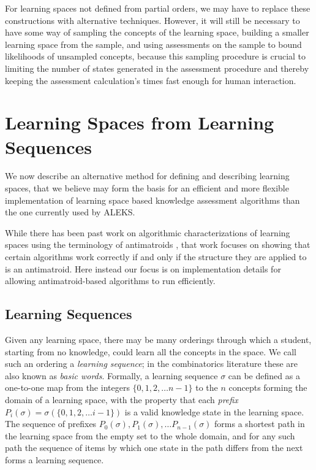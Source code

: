 \documentclass[11pt]{llncs}
\begin{document}
{For learning spaces not defined from partial orders, we may have to replace these constructions with alternative techniques. However, it will still be necessary to have some way of sampling the concepts of the learning space, building a smaller learning space from the sample, and using assessments on the sample to bound likelihoods of unsampled concepts, because this sampling procedure is crucial to limiting the number of states generated in the assessment procedure and thereby keeping the assessment calculation's times fast enough for human interaction.

\section{Learning Spaces from Learning Sequences}

We now describe an alternative method for defining and describing learning spaces, that we believe may form the basis for an efficient and more flexible implementation of learning space based knowledge assessment algorithms than the one currently used by ALEKS.

While there has been past work on algorithmic characterizations of learning spaces using the terminology of antimatroids \citep{BoyFai-DAM-90,KemLev-arXiv-03}, that work focuses on showing that certain algorithms work correctly if and only if the structure they are applied to is an antimatroid. Here instead our focus is on implementation details for allowing antimatroid-based algorithms to run efficiently.

\subsection{Learning Sequences}

Given any learning space, there may be many orderings through which a student, starting from no knowledge, could learn all the concepts in the space. We call such an ordering a \emph{learning sequence}; in the combinatorics literature these are also known as \emph{basic words}.  Formally, a learning sequence $\sigma$ can be defined as a one-to-one map from the integers $\{0,1,2,\ldots n-1\}$ to the $n$ concepts forming the domain of a learning space, with the property that each \emph{prefix} $P_i(\sigma)=\sigma(\{0,1,2,\ldots i-1\})$ is a valid knowledge state in the learning space.  The sequence of prefixes $P_0(\sigma),P_1(\sigma),\ldots P_{n-1}(\sigma)$ forms a shortest path in the learning space from the empty set to the whole domain, and for any such path the sequence of items by which one state in the path differs from the next forms a learning sequence.

}
\end{document}
